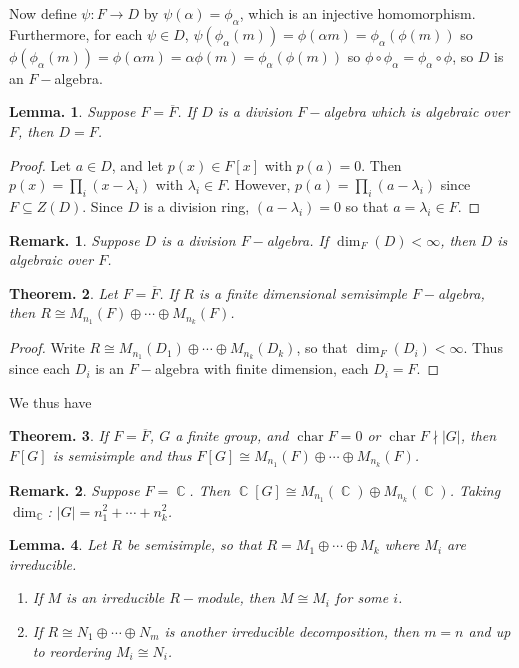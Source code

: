 \documentclass[11pt, a4paper]{memoir}
\DeclareMathOperator{\C}{{\mathbb{C}}}
\theoremstyle{change}
\newtheorem{theorem}{Theorem.}[section]
\newtheorem{lemma}[theorem]{Lemma.}
\theoremstyle{plain}
\theoremstyle{nonumberplain}
\newtheorem{remark}{Remark.}
\newtheorem{proof}{Proof}
\DeclareMathOperator{\chr}{char}
\numberwithin{equation}{section}
\begin{document}
Now define $\psi:F\to D$ by $\psi(\alpha)=\phi_\alpha$, which is an injective homomorphism.
Furthermore, for each $\psi\in D$, $\psi(\phi_\alpha(m))=\phi(\alpha m)=\phi_\alpha(\phi(m))$ so $\phi(\phi_\alpha(m))=\phi(\alpha m)=\alpha\phi(m)=\phi_\alpha(\phi(m))$ so $\phi\circ\phi_\alpha=\phi_\alpha\circ\phi$, so $D$ is an $F-$algebra.
\begin{lemma}
    Suppose $F=\overline{F}$.
    If $D$ is a division $F-$algebra which is algebraic over $F$, then $D=F$.
\end{lemma}
\begin{proof}
    Let $a\in D$, and let $p(x)\in F[x]$ with $p(a)=0$.
    Then $p(x)=\prod_i(x-\lambda_i)$ with $\lambda_i\in F$.
    However, $p(a)=\prod_i(a-\lambda_i)$ since $F\subseteq Z(D)$.
    Since $D$ is a division ring, $(a-\lambda_i)=0$ so that $a=\lambda_i\in F$.
\end{proof}
\begin{remark}
    Suppose $D$ is a division $F-$algebra.
    If $\dim_F(D)<\infty$, then $D$ is algebraic over $F$.
\end{remark}
\begin{theorem}
    Let $F=\overline{F}$.
    If $R$ is a finite dimensional semisimple $F-$algebra, then $R\cong M_{n_1}(F)\oplus\cdots\oplus M_{n_k}(F)$.
\end{theorem}
\begin{proof}
    Write $R\cong M_{n_1}(D_1)\oplus\cdots\oplus M_{n_k}(D_k)$, so that $\dim_F(D_i)<\infty$.
    Thus since each $D_i$ is an $F-$algebra with finite dimension, each $D_i=F$.
\end{proof}
We thus have
\begin{theorem}
    If $F=\overline{F}$, $G$ a finite group, and $\chr F=0$ or $\chr F\nmid |G|$, then $F[G]$ is semisimple and thus $F[G]\cong M_{n_1}(F)\oplus\cdots\oplus M_{n_k}(F)$.
\end{theorem}
\begin{remark}
    Suppose $F=\C$.
    Then $\C[G]\cong M_{n_1}(\C)\oplus M_{n_k}(\C)$.
    Taking $\dim_{\C}$: $|G|=n_1^2+\cdots+n_k^2$.
\end{remark}
\begin{lemma}
    Let $R$ be semisimple, so that $R=M_1\oplus\cdots\oplus M_k$ where $M_i$ are irreducible.
    \begin{enumerate}[nl,r]
        \item If $M$ is an irreducible $R-$module, then $M\cong M_i$ for some $i$.
        \item If $R\cong N_1\oplus\cdots\oplus N_m$ is another irreducible decomposition, then $m=n$ and up to reordering $M_i\cong N_i$.
    \end{enumerate}
\end{lemma}
\end{document}
